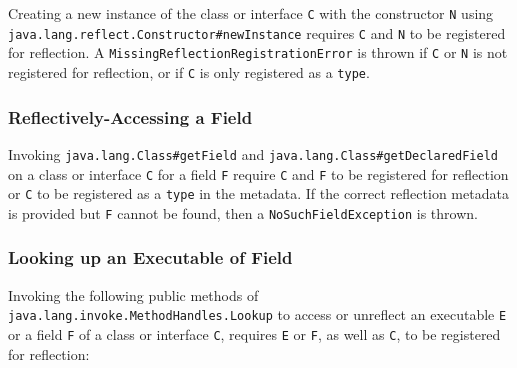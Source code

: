 Creating a new instance of the class or interface \verb|C| with the constructor \verb|N| using \texttt{java.lang.reflect.Constructor\#newInstance} requires \verb|C| and \verb|N| to be registered for reflection. A \texttt{MissingReflectionRegistrationError} is thrown if \verb|C| or \verb|N| is not registered for reflection, or if \verb|C| is only registered as a \texttt{type}.

\subsubsection{Reflectively-Accessing a Field}
Invoking \texttt{java.lang.Class\#getField} and \texttt{java.lang.Class\#getDeclaredField} on a class or interface \verb|C| for a field \verb|F| require \verb|C| and \verb|F| to be registered for reflection or \verb|C| to be registered as a \texttt{type} in the metadata. If the correct reflection metadata is provided but \verb|F| cannot be found, then a \texttt{NoSuchFieldException} is thrown.

\subsubsection{Looking up an Executable of Field}
Invoking the following public methods of \texttt{java.lang.invoke.MethodHandles.Lookup} to access or unreflect an executable \verb|E| or a field \verb|F| of a class or interface \verb|C|, requires \verb|E| or \verb|F|, as well as \verb|C|, to be registered for reflection: 

